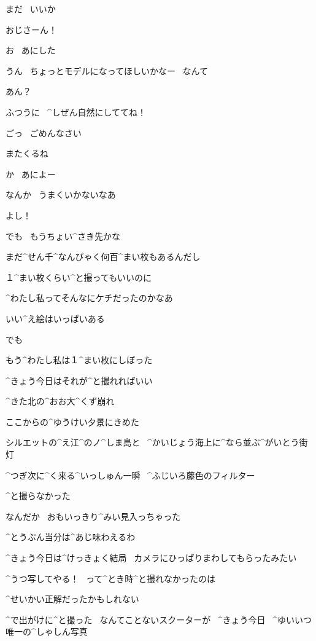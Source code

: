 \Alpha まだ
\ いいか

\page[72]
\Alpha おじさーん！

\Ojisan お
\ あにした

\Alpha うん
\ ちょっとモデルになってほしいかなー
\ なんて

\Ojisan あん？

\Alpha ふつうに
\ ^{しぜん}{自然}にしててね！

\page[73]
\Alpha ごっ
\ ごめんなさい

\Alpha またくるね

\Ojisan か
\ あによー

\Alpha なんか
\ うまくいかないなあ

\page[74]
\Alpha よし！

\Alpha でも
\ もうちょい^{さき}{先}かな

\page[75]
\Alpha まだ^{せん}{千}^{なんびゃく}{何百}^{まい}{枚}もあるんだし

\Alpha １^{まい}{枚}くらい^{と}{撮}ってもいいのに

\Alpha ^{わたし}{私}ってそんなにケチだったのかなあ

\page[76]
\Alpha いい^{え}{絵}はいっぱいある

\Alpha でも

\Alpha もう^{わたし}{私}は１^{まい}{枚}にしぼった

\Alpha ^{きょう}{今日}はそれが^{と}{撮}れればいい

\page[77]
\Alpha ^{きた}{北}の^{おお}{大}^{くず}{崩}れ

\Alpha ここからの^{ゆうけい}{夕景}にきめた

\Alpha シルエットの^{え}{江}^{の}{ノ}^{しま}{島}と
\ ^{かいじょう}{海上}に^{なら}{並}ぶ^{がいとう}{街灯}

\Alpha ^{つぎ}{次}に^{く}{来}る^{いっしゅん}{一瞬}
\ ^{ふじいろ}{藤色}のフィルター

\page[80]
\Alpha ^{と}{撮}らなかった

\Alpha なんだか
\ おもいっきり^{みい}{見入}っちゃった

\Alpha ^{とうぶん}{当分}は^{あじ}{味}わえるわ

\page[81]
\Alpha ^{きょう}{今日}は^{けっきょく}{結局}
\ カメラにひっぱりまわしてもらったみたい

\Alpha ^{うつ}{写}してやる！
\ って^{とき}{時}^{と}{撮}れなかったのは

\Alpha ^{せいかい}{正解}だったかもしれない

\page[82]
\Alpha ^{で}{出}がけに^{と}{撮}った
\ なんてことないスクーターが
\ ^{きょう}{今日}
\ ^{ゆいいつ}{唯一}の^{しゃしん}{写真}

